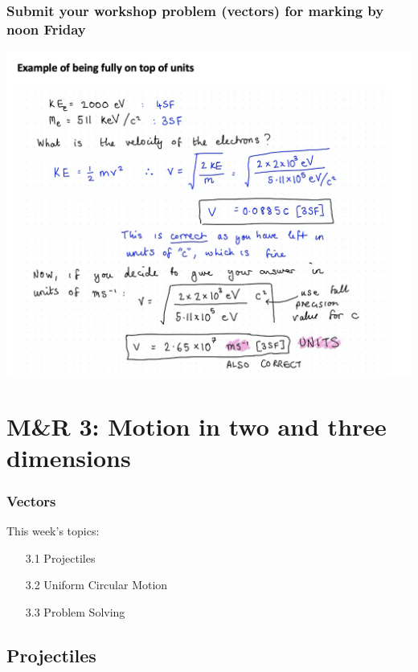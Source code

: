 \begin{frame}
\frametitle{Submit your workshop problem (vectors) for marking by noon Friday}
\includegraphics[scale=0.34]{units}
\end{frame} 
\section{M\&R 3: Motion in two and three dimensions}
\begin{frame}
\frametitle{Vectors} 
\normalsize

This week's topics:\\[3ex]

\begin{itemize}
\item[3.1] Projectiles\\[3ex]
\item[3.2] Uniform Circular Motion\\[3ex]
\item[3.3] Problem Solving\\[3ex]
\end{itemize}
\end{frame} 
 

 \subsection{Projectiles}

